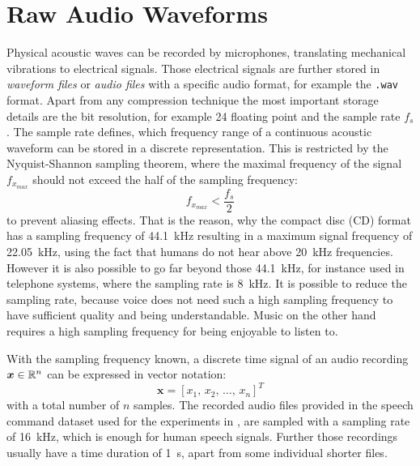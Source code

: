 
\section{Raw Audio Waveforms}\label{sec:signal_raw}
\thesisStateRevised
\thesisStateNew
Physical acoustic waves can be recorded by microphones, translating mechanical vibrations to electrical signals. 
Those electrical signals are further stored in \emph{waveform files} or \emph{audio files} with a specific audio format, for example the \texttt{.wav} format.
Apart from any compression technique the most important storage details are the bit resolution, for example \SI{24}{\bit} floating point and the sample rate $f_s$. 
The sample rate defines, which frequency range of a continuous acoustic waveform can be stored in a discrete representation.
This is restricted by the Nyquist-Shannon sampling theorem, where the maximal frequency of the signal $f_{x_{max}}$ should not exceed the half of the sampling frequency: 
\begin{equation}\label{eq:signal_raw_nyquist}
  f_{x_{max}} < \frac{f_s}{2}
\end{equation}
to prevent aliasing effects.
That is the reason, why the compact disc (CD) format has a sampling frequency of \SI{44.1}{\kilo\hertz} resulting in a maximum signal frequency of \SI{22.05}{\kilo\hertz}, using the fact that humans do not hear above \SI{20}{\kilo\hertz} frequencies.
However it is also possible to go far beyond those \SI{44.1}{\kilo\hertz}, for instance used in telephone systems, where the sampling rate is \SI{8}{\kilo\hertz}.
It is possible to reduce the sampling rate, because voice does not need such a high sampling frequency to have sufficient quality and being understandable.
Music on the other hand requires a high sampling frequency for being enjoyable to listen to.

With the sampling frequency known, a discrete time signal of an audio recording $\bm{x} \in \mathbb{R}^n$ can be expressed in vector notation:
\begin{equation}\label{eq:signal_raw_x}
  \bm{x} = [x_1,\, x_2,\, \dots,\, x_n]^T
\end{equation}
with a total number of $n$ samples.
The recorded audio files provided in the speech command dataset \cite{Warden2018} used for the experiments in , are sampled with a sampling rate of \SI{16}{\kilo\hertz}, which is enough for human speech signals.
Further those recordings usually have a time duration of \SI{1}{\second}, apart from some individual shorter files.

